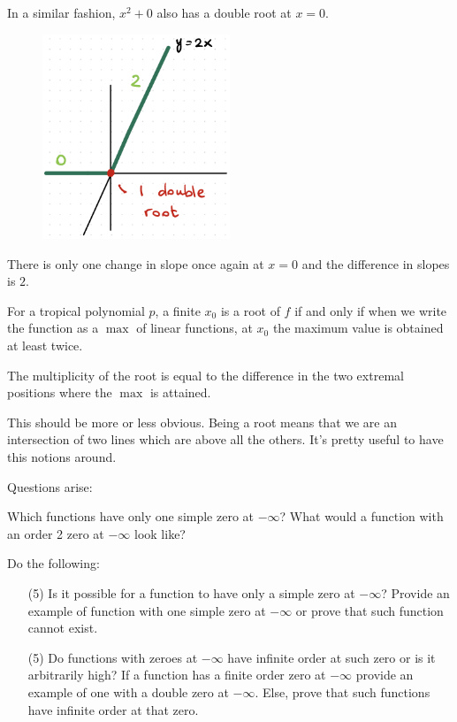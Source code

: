 \documentclass[12pt]{memoir}
\theoremstyle{definition}
\begin{document}
\begin{Ex}
    In a similar fashion, $x^2+0$ also has a double root at $x=0$.
    \begin{figure}[h!]
        \centering
        \includegraphics[width=0.5\textwidth]{figs/fig3-6DoubleRootTropicalPolynomial2.png}
        \label{fig:3.6-DoubleRoot6}
    \end{figure}
    There is only one change in slope once again at $x=0$ and the difference in slopes is $2$.
\end{Ex}

\begin{Lem}
For a tropical polynomial $p$, a finite $x_0$ is a root of $f$ if and only if when we write the function as a $\max$ of linear functions, at $x_0$ the maximum value is obtained at least twice.\par 
The multiplicity of the root is equal to the difference in the two extremal positions where the $\max$ is attained.
\end{Lem}

This should be more or less obvious. Being a root means that we are an intersection of two lines which are above all the others. It's pretty useful to have this notions around.

Questions arise:
\begin{significant}
    Which functions have only one simple zero at $-\infty$? What would a function with an order 2 zero at $-\infty$ look like?
\end{significant}

\begin{Ej}
    Do the following:
    \begin{itemize}
        \item[(5)] Is it possible for a function to have only a simple zero at $-\infty$? Provide an example of function with one simple zero at $-\infty$ or prove that such function cannot exist. 
        \item[(5)] Do functions with zeroes at $-\infty$ have infinite order at such zero or is it arbitrarily high? If a function has a finite order zero at $-\infty$ provide an example of one with a double zero at $-\infty$. Else, prove that such functions have infinite order at that zero.
    \end{itemize}
\end{Ej}
\end{document}
